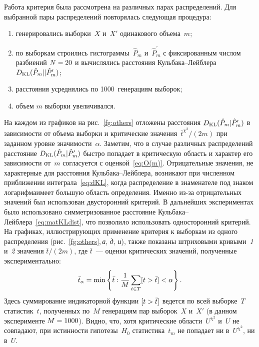 \begin{multicols}{2}
Работа критерия была рассмотрена на различных парах распределений.
Для выбранной пары распределений повторялась следующая процедура:
 \begin{enumerate}[(1)]
 \item генерировались выборки~$X$ и~${X'}$ одинакового объема~$m$;
 \item по выборкам строились гистограммы~$\hat{P}_m$ и~$\hat{P}^\prime_m$
 с фиксированным числом разбиений $N \hm= 20$ и вычислялись расстояния
 Кульбака--Лейблера $D_{\mathrm{KL}}(\hat{P}_m || \hat{P}^\prime_m)$;
     \item расстояния усреднялись по 1000~генерациям выборок;
     \item объем $m$ выборки увеличивался.
     \end{enumerate}
     На каждом из графиков на рис.~\ref{fg:others} отложены рас\-сто\-яния
     $D_{\mathrm{KL}}(\hat{P}_m | \hat{P}^\prime_m)$ в зависимости от объема выборки и
     критические значения~$\bar{t}^{\chi^2}/(2m)$ при заданном уровне
     значимости~$\alpha$. Заметим, что в случае различных распределений
     расстояние $D_{\mathrm{KL}}(\hat{P}_m | \hat{P}^\prime_m)$ быстро попадает в критическую
     область и характер его зависимости от~$m$ согласуется с
     оценкой~\eqref{eq:O(m)}. Отрицательные значения, не характерные для
     расстояния Куль\-ба\-ка--Лейб\-ле\-ра, возникают при чис\-лен\-ном приближении
     интеграла~\eqref{eq:dKL}, когда распределение в знаменателе под знаком
     логарифма\linebreak имеет большую область определения. Именно из-за отрицательных
     значений был использован двусторонний критерий. В дальнейших экспериментах
     было использовано симметризованное расстояние
     Куль\-ба\-ка--Лейб\-ле\-ра~\eqref{eq:matKLdist}, что позволило использовать
     односторонний критерий. На графиках, иллюстрирующих применение критерия
     к выборкам из одного распределения (рис.~\ref{fg:others},\,\textit{а}, \textit{д}, \textit{и}),
     также показаны штриховыми кривыми~\textit{1} и~\textit{2}
     значения $\bar{t}/(2m)$, где $\bar{t}$~---
     оценки критических значений, полученные экспериментально:
     $$
     \bar{t}_{\alpha} = \min\left\{\bar{t} : \displaystyle\frac{\displaystyle 1\mathstrut}{\displaystyle M\mathstrut}\sum\limits_{t\in{T}} [t > \bar{t}]
     < \alpha\right\}.
     $$
      Здесь суммирование индикаторной функции $[t \hm> \bar{t}]$ ведется по
      всей выборке~$T$ статистик~$t$, полученных по~$M$ генерациям пар выборок~$X$
      и~$X'$ (в данном эксперименте $M\hm = 1000$). Видно, что, хотя критические
      области~$U^{\chi^2}$ и~$U$ не совпадают, при истинности гипотезы~$H_0$
      статистика~$t_m$ не попадает ни в~$U^{\chi^2}$, ни в~$U$.



\end{multicols}
